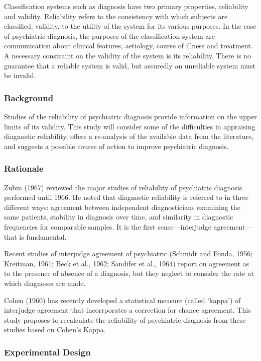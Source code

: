 \begin{refsection}
Classification systems such as diagnosis have two primary properties, reliability and validity. Reliability refers to the consistency with which subjects are classified; validity, to the utility of the system for its various purposes. In the case of psychiatric diagnosis, the purposes of the classification system are communication about clinical features, aetiology, course of illness and treatment. A necessary constraint on the validity of the system is its reliability. There is no guarantee that a reliable system is valid, but assuredly an unreliable system must be invalid.

\subsubsection{Background}
\label{background}

Studies of the reliability of psychiatric diagnosis provide information on the upper limits of its validity. This study will consider some of the difficulties in appraising diagnostic reliability, offers a re-analysis of the available data from the literature, and suggests a possible course of action to improve psychiatric diagnosis.

\subsubsection{Rationale}
\label{rationale}

Zubin (1967) reviewed the major studies of reliability of psychiatric diagnosis performed until 1966. He noted that diagnostic reliability is referred to in three different ways: agreement between independent diagnosticians examining the same patients, stability in diagnosis over time, and similarity in diagnostic frequencies for comparable samples. It is the first sense---interjudge agreement---that is fundamental.

Recent studies of interjudge agreement of psychiatric (Schmidt and Fonda, 1956; Kreitman, 1961; Beck et al., 1962; Sandifer et al., 1964) report on agreement as to the presence of absence of a diagnosis, but they neglect to consider the rate at which diagnoses are made.

Cohen (1960) has recently developed a statistical measure (called `kappa') of interjudge agreement that incorrporates a correction for chance agreement. This study proposes to recalculate the reliability of psychiatric diagnosis from these studies based on Cohen's Kappa.

\subsubsection{Experimental Design}
\label{experimentaldesign}


\end{refsection}
